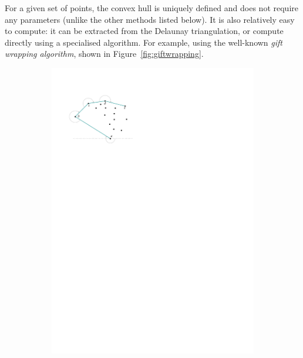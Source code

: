 For a given set of points, the convex hull is uniquely defined and does not require any parameters (unlike the other methods listed below).
It is also relatively easy to compute: it can be extracted from the Delaunay triangulation, or compute directly using a specialised algorithm.
For example, using the well-known \emph{gift wrapping algorithm}, shown in Figure~\ref{fig:giftwrapping}.
\begin{figure}
  \centering
  \centering
  \begin{subfigure}[b]{0.3\linewidth}
    \centering
    \includegraphics[page=1,width=\textwidth]{figs/giftwrapping.pdf}
    \caption{}
  \end{subfigure}%
  \qquad
  \begin{subfigure}[b]{0.3\linewidth}
    \centering

\end{subfigure}
\end{figure}
